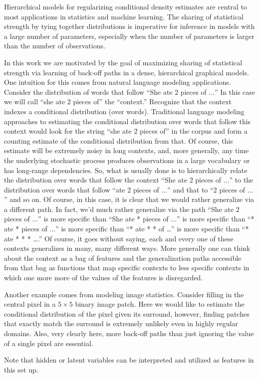 Hierarchical models for regularizing conditional density estimates are central to most applications in statistics and machine learning.  The sharing of statistical strength by tying together distributions is imperative for inference in models with a large number of parameters, especially when the number of parameters is larger than the number of observations.  

In this work we are motivated by the goal of maximizing sharing of statistical strength via learning of back-off paths in a dense, hierarchical graphical models.  One intuition for this comes from natural language modeling applications.  Consider the distribution of words that follow ``She ate 2 pieces of  $\ldots$''  In this case we will call ``she ate 2 pieces of'' the ``context.''  Recognize that the context indexes a conditional distribution (over words).  Traditional \ngram language modeling approaches to estimating the conditional distribution over words that follow this context would look for the string ``she ate 2 pieces of'' in the corpus and form a counting estimate of the conditional distribution from that.  Of course, this estimate will be extremely noisy in long contexts, and, more generally, any time the underlying stochastic process produces observations in a large vocabulary or has long-range dependencies.   So, what is usually done is to hierarchically relate the distribution over words that follow the context ``She ate 2 pieces of $\ldots$'' to the distribution over words that follow ``ate 2 pieces of $\ldots$'' and that to ``2 pieces of $\ldots$'' and so on.  Of course, in this case, it is clear that we would rather generalize via a different path.  In fact, we'd much rather generalize via the path ``She ate 2 pieces of $\ldots$'' is more specific than ``She ate * pieces of $\ldots$'' is more specific than ``* ate * pieces of $\ldots$'' is more specific than ``* ate * * of \ldots'' is more specific than ``* ate * * * \ldots.''  Of course, it goes without saying, each and every one of these contexts generalizes in many, many different ways.  More generally one can think about the context as a bag of features and the generalization paths accessible from that bag as functions that map specific contexts to less specific contexts in which one more more of the values of the features is disregarded.

Another example comes from modeling image statistics.  Consider filling in the central pixel in a $5\times5$ binary image patch.  Here we would like to estimate the conditional distribution of the pixel given its surround, however, finding patches that exactly match the surround is extremely unlikely even in highly regular domains.  Also, very clearly here, more back-off paths than just ignoring the value of a single pixel are essential.

Note that hidden or latent variables can be interpreted and utilized as features in this set up.  